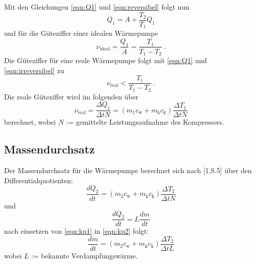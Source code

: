 Mit den Gleichungen \ref{eqn:Q1} und \ref{eqn:reversibel} folgt nun
\begin{equation}
	Q_\text{1} = A + \frac{T_\text{2}}{T_\text{1}} Q_\text{1}
\end{equation}
und für die Güteziffer einer idealen Wärmepumpe
\begin{equation}
	\nu_\text{ideal} = \frac{Q_\text{1}}{A} = \frac{T_\text{1}}{T_\text{1} - T_\text{2}} \ .
	\label{eqn:nuideal}
\end{equation}
Die Güteziffer für eine reale Wärmepumpe folgt mit \ref{eqn:Q1} und \ref{eqn:irreversibel} zu
\begin{equation}
	\nu_\text{real} < \frac{T_\text{1}}{T_\text{1} - T_\text{2}} \ .
\end{equation}
Die reale Güteziffer wird im folgenden über
\begin{equation}
	\nu_\text{real} = \frac{\Delta Q_\text{1}}{\Delta t N} = (m_\text{1} c_\text{w} + m_\text{k} c_\text{k}) \frac{\Delta T_\text{1}}{\Delta t N}
	\label{eqn:nureal}
\end{equation}
berechnet, wobei $N$ := gemittelte Leistungsaufnahme des Kompressors.

\subsection{Massendurchsatz}
Der Massendurchsatz für die Wärmepumpe berechnet sich nach [1,S.5] über den Differentialquotienten:
\begin{equation}
	\label{eqn:kp1}
	\frac{d Q_\text{2}}{d t} = (m_\text{2} c_\text{w} + m_\text{k} c_\text{k}) \frac{\Delta T_\text{2}}{\Delta t N}
\end{equation}
und
\begin{equation}
	\label{eqn:kp2}
	\frac{d Q_\text{2}}{d t} = L \frac{d m}{d t}
\end{equation}
nach einsetzen von \ref{eqn:kp1} in \ref{eqn:kp2} folgt:
\begin{equation}
	\frac{dm}{dt} = (m_\text{2} c_\text{w} + m_\text{k} c_\text{k}) \frac{\Delta T_\text{2}}{\Delta t L}
\end{equation}
wobei $L$ := bekannte Verdampfungswärme.

